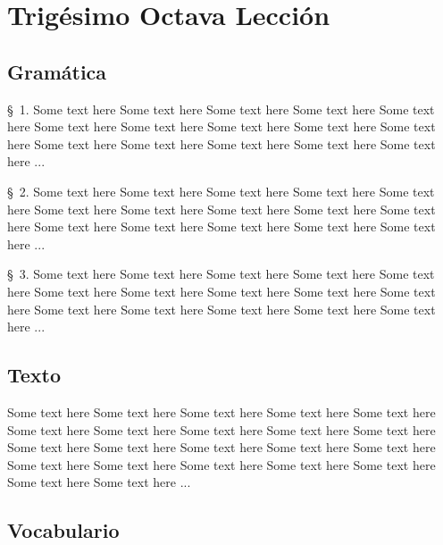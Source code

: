 
\chapter{Trigésimo Octava Lección} %

\label{ch:lesson38} %



\Large{\section*{Gramática}}

\S\ 1. Some text here Some text here Some text here Some text here Some text here Some text here Some text here Some text here Some text here Some text here Some text here Some text here Some text here Some text here Some text here ...

\S\ 2. Some text here Some text here Some text here Some text here Some text here Some text here Some text here Some text here Some text here Some text here Some text here Some text here Some text here Some text here Some text here ...

\S\ 3. Some text here Some text here Some text here Some text here Some text here Some text here Some text here Some text here Some text here Some text here Some text here Some text here Some text here Some text here Some text here ...

\Large{\section*{Texto}}

Some text here Some text here Some text here Some text here Some text here Some text here Some text here Some text here Some text here Some text here Some text here Some text here Some text here Some text here Some text here Some text here Some text here Some text here Some text here Some text here Some text here Some text here ...

\Large{\section*{Vocabulario}}

